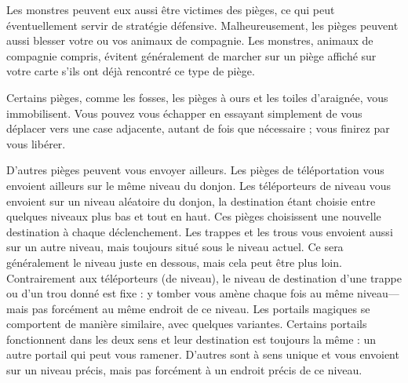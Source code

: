 \documentclass[titlepage]{article}
\begin{document}
Les monstres peuvent eux aussi être victimes des
pièges, ce qui peut éventuellement servir de stratégie défensive.
Malheureusement, les pièges peuvent aussi blesser votre ou vos animaux de compagnie.
Les monstres, animaux de compagnie compris, évitent généralement de marcher sur
un piège affiché sur votre carte s'ils ont déjà rencontré ce type de piège.

Certains pièges, comme les fosses, les pièges à ours et les toiles d'araignée,
vous immobilisent.
Vous pouvez vous échapper en essayant simplement de vous déplacer vers une case
adjacente, autant de fois que nécessaire ; vous finirez par vous libérer.

D'autres pièges peuvent vous envoyer ailleurs.
Les pièges de téléportation vous envoient ailleurs sur le même niveau du donjon.
Les téléporteurs de niveau vous envoient sur un niveau aléatoire du donjon, la
destination étant choisie entre quelques niveaux plus bas et tout en haut.
Ces pièges choisissent une nouvelle destination à chaque déclenchement.
Les trappes et les trous vous envoient aussi sur un autre niveau, mais toujours
situé sous le niveau actuel.
Ce sera généralement le niveau juste en dessous, mais cela peut être plus loin.
Contrairement aux téléporteurs (de niveau), le niveau de destination d'une trappe
ou d'un trou donné est fixe : y tomber vous amène chaque fois au même niveau---mais
pas forcément au même endroit de ce niveau.
Les portails magiques se comportent de manière similaire, avec quelques variantes.
Certains portails fonctionnent dans les deux sens et leur destination est
toujours la même : un autre portail qui peut vous ramener.
D'autres sont à sens unique et vous envoient sur un niveau précis, mais pas
forcément à un endroit précis de ce niveau.
\end{document}

